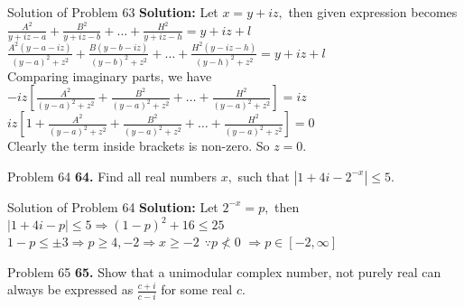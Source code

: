 \documentclass[aspectratio=169,8pt]{beamer}
\begin{document}
\begin{frame}{Solution of Problem 63}
  \textbf{Solution:} Let $x = y + iz,$ then given expression becomes\\
  \vspace*{0.2cm}
  $\frac{A^2}{y + iz - a} + \frac{B^2}{y + iz - b} + \ldots + \frac{H^2}{y + iz - h} = y + iz + l$\\
  \vspace*{0.2cm}
  $\frac{A^2(y - a - iz)}{(y - a)^2 + z^2} + \frac{B(y - b - iz)}{(y - b)^2 + z^2} + \ldots + \frac{H^2(y - iz - h)}{(y - h)^2 + z^2} = y + iz + l$\\
  \vspace*{0.2cm}
  Comparing imaginary parts, we have\\
  \vspace*{0.2cm}
  $-iz\left[\frac{A^2}{(y - a)^2 + z^2} + \frac{B^2}{(y - a)^2 + z^2} + \ldots + \frac{H^2}{(y - a)^2 + z^2}\right] = iz$\\
  \vspace*{0.2cm}
  $iz\left[1 + \frac{A^2}{(y - a)^2 + z^2} + \frac{B^2}{(y - a)^2 + z^2} + \ldots + \frac{H^2}{(y - a)^2 + z^2}\right] = 0$\\
  \vspace*{0.2cm}
  Clearly the term inside brackets is non-zero. So $z = 0.$
\end{frame}
\begin{frame}{Problem 64}
  \textbf{64.} Find all real numbers $x,$ such that $|1 + 4i - 2^{-x}|\leq 5.$
\end{frame}
\begin{frame}{Solution of Problem 64}
  \textbf{Solution:} Let $2^{-x} = p,$ then\\
  \vspace*{0.2cm}
  $|1 + 4i - p|\leq 5 \Rightarrow (1 - p)^2 + 16 \leq 25$\\
  \vspace*{0.2cm}
  $1 - p \leq \pm3 \Rightarrow p \geq 4, -2 \Rightarrow x \geq -2~~\because p \nless 0$
  \vspace*{0.2cm}
  $\Rightarrow p \in [-2, \infty]$
\end{frame}
\begin{frame}{Problem 65}
  \textbf{65.} Show that a unimodular complex number, not purely real can always be expressed as $\frac{c + i}{c - i}$ for some real $c.$
\end{frame}
\end{document}
